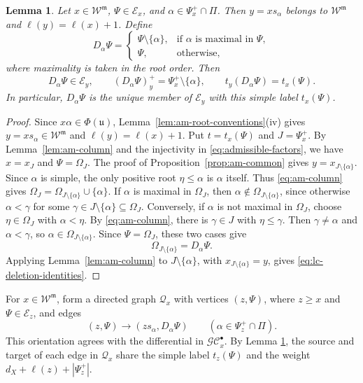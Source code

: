 \documentclass[12pt]{amsart}
\newtheorem{lemma}[theorem]{Lemma}
\theoremstyle{definition}
\numberwithin{equation}{section}
\newcommand{\m}{\mathfrak m}
\newcommand{\W}{\mathscr W}
\begin{document}
\begin{lemma}\label{lem:lc-deletion}
Let $x\in\W^{\m}$, $\Psi\in\mathscr E_x$, and
$\alpha\in\Psi_x^+\cap\Pi$. Then $y=xs_\alpha$ belongs to
$\W^{\m}$ and $\ell(y)=\ell(x)+1$. Define
\begin{equation}\label{eq:lc-root-deletion}
D_\alpha\Psi
=\begin{cases}
\Psi\setminus\{\alpha\},&\text{if $\alpha$ is maximal in $\Psi$},\\
\Psi,&\text{otherwise},
\end{cases}
\end{equation}
where maximality is taken in the root order. Then
\begin{equation}\label{eq:lc-deletion-identities}
D_\alpha\Psi\in\mathscr E_y,\qquad
(D_\alpha\Psi)_y^+=\Psi_x^+\setminus\{\alpha\},\qquad
t_y(D_\alpha\Psi)=t_x(\Psi).
\end{equation}
In particular, $D_\alpha\Psi$ is the unique member of
$\mathscr E_y$ with this simple label $t_x(\Psi)$.
\end{lemma}

\begin{proof}
Since $x\alpha\in\Phi(\mathfrak{u})$,
Lemma~\ref{lem:am-root-conventions}\textup{(iv)} gives
$y=xs_\alpha\in\W^{\m}$ and $\ell(y)=\ell(x)+1$.
Put $t=t_x(\Psi)$ and $J=\Psi_x^+$.
By Lemma~\ref{lem:am-column} and the injectivity in
\eqref{eq:admissible-factors}, we have
$x=x_J$ and $\Psi=\Omega_J$.
The proof of Proposition~\ref{prop:am-common} gives
$y=x_{J\setminus\{\alpha\}}$. Since $\alpha$ is simple, the only positive root
$\eta\leq\alpha$ is $\alpha$ itself. Thus
\eqref{eq:am-column} gives $\Omega_J=\Omega_{J\setminus\{\alpha\}}\cup\{\alpha\}$. If $\alpha$ is maximal in $\Omega_J$, then
$\alpha\notin\Omega_{J\setminus\{\alpha\}}$, since otherwise
$\alpha<\gamma$ for some
$\gamma\in J\setminus\{\alpha\}\subseteq\Omega_J$.
Conversely, if $\alpha$ is not maximal in $\Omega_J$,
choose $\eta\in\Omega_J$ with $\alpha<\eta$.
By \eqref{eq:am-column}, there is $\gamma\in J$
with $\eta\leq\gamma$. Then $\gamma\neq\alpha$ and
$\alpha<\gamma$, so
$\alpha\in\Omega_{J\setminus\{\alpha\}}$.
Since $\Psi=\Omega_J$, these two cases give
\[
\Omega_{J\setminus\{\alpha\}}=D_\alpha\Psi.
\]
Applying Lemma~\ref{lem:am-column} to
$J\setminus\{\alpha\}$, with
$x_{J\setminus\{\alpha\}}=y$, gives
\eqref{eq:lc-deletion-identities}.
\end{proof}

For $x\in \W^{\m}$, form a directed graph $\mathscr{Q}_x$ with vertices $(z,\Psi)$, where
$z\geq x$ and $\Psi\in\mathscr E_z$, and edges
\begin{equation}
(z,\Psi)\longrightarrow(zs_\alpha,D_\alpha\Psi)
\qquad(\alpha\in\Psi_z^+\cap\Pi).
\end{equation}
This orientation agrees with the differential in $\mathscr{GC}_x^{\bullet}$.
By Lemma \ref{lem:lc-deletion}, the source and target of each edge in $\mathscr{Q}_x$ share the simple label $t_z(\Psi)$ and the weight
$d_X+\ell(z)+|\Psi_z^+|$.
\end{document}
